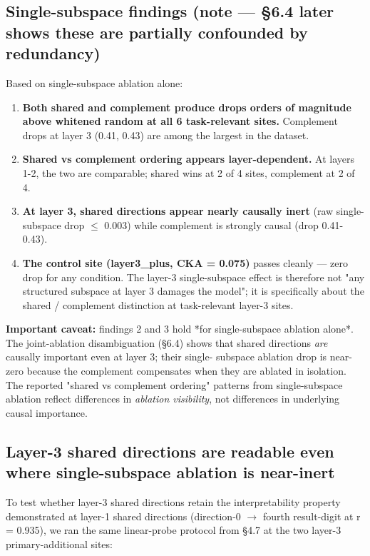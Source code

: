 \subsection{Single-subspace findings (note --- \S{}6.4 later shows these are partially confounded by redundancy)}

Based on single-subspace ablation alone:

\begin{enumerate}
  \item \textbf{Both shared and complement produce drops orders of magnitude above whitened random at all 6 task-relevant sites.} Complement drops at layer 3 (0.41, 0.43) are among the largest in the dataset.
  \item \textbf{Shared vs complement ordering appears layer-dependent.} At layers 1-2, the two are comparable; shared wins at 2 of 4 sites, complement at 2 of 4.
  \item \textbf{At layer 3, shared directions appear nearly causally inert} (raw single-subspace drop $\leq$ 0.003) while complement is strongly causal (drop 0.41-0.43).
  \item \textbf{The control site (layer3\_plus, CKA = 0.075)} passes cleanly --- zero drop for any condition. The layer-3 single-subspace effect is therefore not "any structured subspace at layer 3 damages the model"; it is specifically about the shared / complement distinction at task-relevant layer-3 sites.
\end{enumerate}

\textbf{Important caveat:} findings 2 and 3 hold *for single-subspace ablation
alone*. The joint-ablation disambiguation (\S{}6.4) shows that shared
directions \emph{are} causally important even at layer 3; their single-
subspace ablation drop is near-zero because the complement compensates
when they are ablated in isolation. The reported "shared vs complement
ordering" patterns from single-subspace ablation reflect differences in
\emph{ablation visibility}, not differences in underlying causal importance.

\subsection{Layer-3 shared directions are readable even where single-subspace ablation is near-inert}

To test whether layer-3 shared directions retain the interpretability
property demonstrated at layer-1 shared directions (direction-0 $\to$ fourth
result-digit at r = 0.935), we ran the same linear-probe protocol from
\S{}4.7 at the two layer-3 primary-additional sites:


